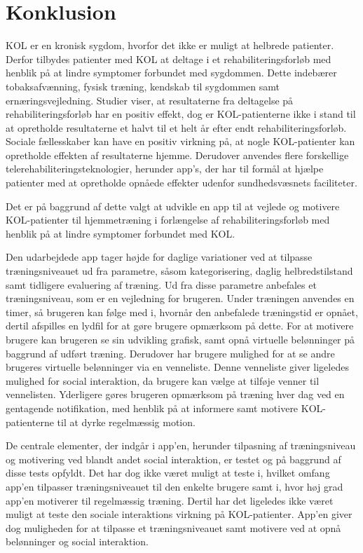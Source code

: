 \section{Konklusion}
KOL er en kronisk sygdom, hvorfor det ikke er muligt at helbrede patienter. Derfor tilbydes patienter med KOL at deltage i et rehabiliteringsforløb med henblik på at lindre symptomer forbundet med sygdommen. Dette indebærer tobaksafvænning, fysisk træning, kendskab til sygdommen samt ernæringsvejledning. Studier viser, at resultaterne fra deltagelse på rehabiliteringsforløb har en positiv effekt, dog er KOL-patienterne ikke i stand til at opretholde resultaterne et halvt til et helt år efter endt rehabiliteringsforløb. Sociale fællesskaber kan have en positiv virkning på, at nogle KOL-patienter kan opretholde effekten af resultaterne hjemme. Derudover anvendes flere forskellige telerehabiliteringsteknologier, herunder app’s, der har til formål at hjælpe patienter med at opretholde opnåede effekter udenfor sundhedsvæsnets faciliteter. 

Det er på baggrund af dette valgt at udvikle en app til at vejlede og motivere KOL-patienter til hjemmetræning i forlængelse af rehabiliteringsforløb med henblik på at lindre symptomer forbundet med KOL.

Den udarbejdede app tager højde for daglige variationer ved at tilpasse træningsniveauet ud fra parametre, såsom kategorisering, daglig helbredstilstand samt tidligere evaluering af træning. Ud fra disse parametre anbefales et træningsniveau, som er en vejledning for brugeren. Under træningen anvendes en timer, så brugeren kan følge med i, hvornår den anbefalede træningstid er opnået, dertil afspilles en lydfil for at gøre brugere opmærksom på dette. For at motivere brugere kan brugeren se sin udvikling grafisk, samt opnå virtuelle belønninger på baggrund af udført træning. Derudover har brugere mulighed for at se andre brugeres virtuelle belønninger via en venneliste. Denne venneliste giver ligeledes mulighed for social interaktion, da brugere kan vælge at tilføje venner til vennelisten. Yderligere gøres brugeren opmærksom på træning hver dag ved en gentagende notifikation, med henblik på at informere samt motivere KOL-patienterne til at dyrke regelmæssig motion.  

De centrale elementer, der indgår i app’en, herunder tilpasning af træningsniveau og motivering ved blandt andet social interaktion, er testet og på baggrund af disse tests opfyldt. Det har dog ikke været muligt at teste i, hvilket omfang app'en tilpasser træningsniveauet til den enkelte brugere samt i, hvor høj grad app'en motiverer til regelmæssig træning. Dertil har det ligeledes ikke været muligt at teste den sociale interaktions virkning på KOL-patienter. App’en giver dog muligheden for at tilpasse et træningsniveauet samt motivere ved at opnå belønninger og social interaktion. 

